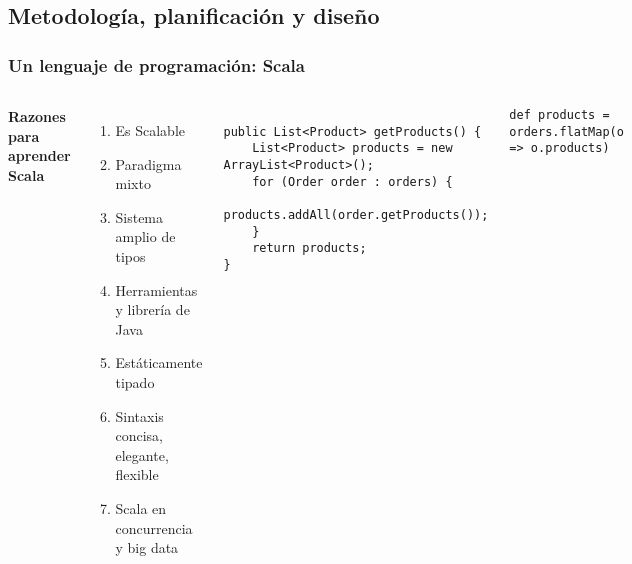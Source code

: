 \documentclass{beamer}
\begin{document}
\subsection{Metodología, planificación y diseño}
\begin{frame}[fragile]
\frametitle{Un lenguaje de programación: Scala}
\begin{columns}[c] %

\textbf{Razones para aprender Scala}
\begin{enumerate}
\item Es Scalable
\item Paradigma mixto
\item Sistema amplio de tipos
\item Herramientas y librería de Java
\item Estáticamente tipado
\item Sintaxis concisa, elegante, flexible
\item Scala en concurrencia y big data
\end{enumerate}

\begin{example}
\begin{tiny}
\begin{verbatim}

public List<Product> getProducts() {
    List<Product> products = new ArrayList<Product>();
    for (Order order : orders) {
        products.addAll(order.getProducts());
    }
    return products;
}

\end{verbatim}\end{tiny}
\end{example}

\begin{example}
\begin{tiny}
\begin{verbatim}
def products = orders.flatMap(o => o.products)
\end{verbatim}\end{tiny}
\end{example}
\end{columns}
\end{frame}
\end{document}
